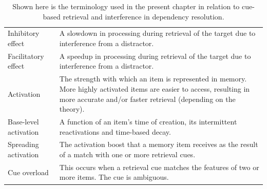\documentclass{cambridge7A}\usepackage[]{graphicx}\usepackage[]{color}
\begin{document}
\begin{subappendices}
\begin{table}[!htbp]
\begin{center}
{\begin{tabular}{p{4cm}p{6cm}}
Inhibitory effect   & A slowdown in processing during retrieval of the target due to interference from a distractor. \\
Facilitatory effect & A speedup in processing during retrieval of the target due to interference from a distractor. \\
Activation          & The strength with which an item is represented in memory. More highly activated items are easier to access, resulting in more accurate and/or faster retrieval (depending on the theory). \\
Base-level activation & A function of an item's time of creation, its intermittent reactivations and time-based decay. \\
Spreading activation & The activation boost that a memory item receives as the result of a match with one or more retrieval cues. \\
Cue overload        & This occurs when a retrieval cue matches the features of two or more items. The cue is ambiguous. \\
\hline
\end{tabular}
}
\caption{Shown  here is the terminology used in the present chapter in relation to cue-based retrieval and interference in dependency resolution.}\label{tab:definitionsCBR}
\end{center}
\end{table}




\end{subappendices}
\end{document}
